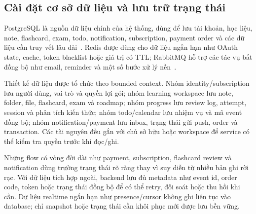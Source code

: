 \subsection{Cài đặt cơ sở dữ liệu và lưu trữ trạng thái}
\label{subsec:database-implementation}

PostgreSQL là nguồn dữ liệu chính của hệ thống, dùng để lưu tài khoản, học liệu, note, flashcard, exam, todo, notification, subscription, payment order và các dữ liệu cần truy vết lâu dài~\cite{postgresqlabout}. Redis được dùng cho dữ liệu ngắn hạn như OAuth state, cache, token blacklist hoặc giá trị có TTL; RabbitMQ hỗ trợ các tác vụ bất đồng bộ như email, reminder và một số bước xử lý nền~\cite{redisoverview,rabbitmqtutorials}.

Thiết kế dữ liệu được tổ chức theo bounded context. Nhóm identity/subscription lưu người dùng, vai trò và quyền lợi gói; nhóm learning workspace lưu note, folder, file, flashcard, exam và roadmap; nhóm progress lưu review log, attempt, session và phân tích kiến thức; nhóm todo/calendar lưu nhiệm vụ và mã event đồng bộ; nhóm notification/payment lưu inbox, trạng thái gửi push, order và transaction. Các tài nguyên đều gắn với chủ sở hữu hoặc workspace để service có thể kiểm tra quyền trước khi đọc/ghi.

Những flow có vòng đời dài như payment, subscription, flashcard review và notification dùng trường trạng thái rõ ràng thay vì suy diễn từ nhiều bản ghi rời rạc. Với dữ liệu tích hợp ngoài, backend lưu đủ metadata như event id, order code, token hoặc trạng thái đồng bộ để có thể retry, đối soát hoặc thu hồi khi cần. Dữ liệu realtime ngắn hạn như presence/cursor không ghi liên tục vào database; chỉ snapshot hoặc trạng thái cần khôi phục mới được lưu bền vững.